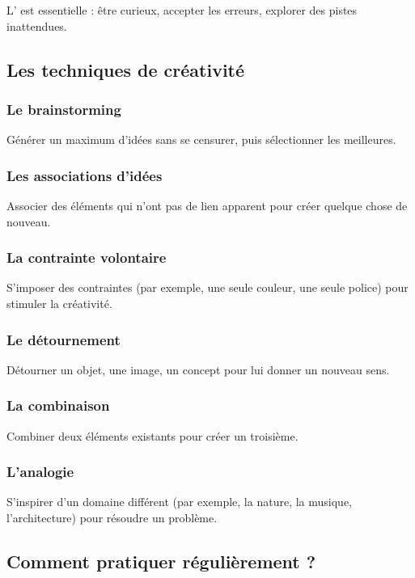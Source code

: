 L' est essentielle : être curieux, accepter les erreurs, explorer des pistes inattendues.

\subsection{Les techniques de créativité}

\subsubsection{Le brainstorming}

Générer un maximum d'idées sans se censurer, puis sélectionner les meilleures.

\subsubsection{Les associations d'idées}

Associer des éléments qui n'ont pas de lien apparent pour créer quelque chose de nouveau.

\subsubsection{La contrainte volontaire}

S'imposer des contraintes (par exemple, une seule couleur, une seule police) pour stimuler la créativité.

\subsubsection{Le détournement}

Détourner un objet, une image, un concept pour lui donner un nouveau sens.

\subsubsection{La combinaison}

Combiner deux éléments existants pour créer un troisième.

\subsubsection{L'analogie}

S'inspirer d'un domaine différent (par exemple, la nature, la musique, l'architecture) pour résoudre un problème.

\subsection{Comment pratiquer régulièrement ?}

